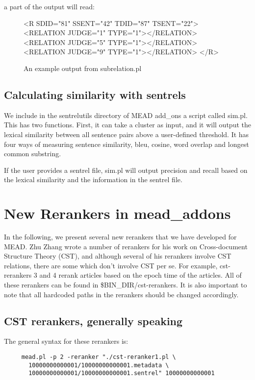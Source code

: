 \documentclass[10pt]{article}
\begin{document}
 a part of the output will read:


\begin{figure}[htp!]
\centering
\begin{boxedverbatim}
<R SDID="81" SSENT="42" TDID="87" TSENT="22">
<RELATION JUDGE="1" TYPE="1"></RELATION>
<RELATION JUDGE="5" TYPE="1"></RELATION>
<RELATION JUDGE="9" TYPE="1"></RELATION>
</R>
\end{boxedverbatim}
\caption{An example output from subrelation.pl}
\label{figure:subrelation.pl}
\end{figure}

\subsection{Calculating similarity with sentrels}
We include in the sentrelutils directory of MEAD add\_ons a script called 
sim.pl.  This has two functions.  First, it can take a cluster as input, 
and it will output the lexical similarity between all sentence pairs above 
a user-defined threshold.  It has four ways of measuring sentence 
similarity, bleu, cosine, word overlap and longest common substring.  

If the user provides a sentrel file, sim.pl will output precision and 
recall based on the lexical similarity and the information in the sentrel 
file. 


\section{New Rerankers in mead\_addons}
In the following, we present several new rerankers that we have developed 
for MEAD.  Zhu Zhang wrote a number of rerankers for his work on Cross-document 
Structure Theory (CST), and
although several of his rerankers involve CST relations, there are some 
which don't involve CST per se.  For example, cst-rerankers 3 and 4 rerank articles based 
on the epoch time of the articles.
All of these rerankers can be found in \$BIN\_DIR/cst-rerankers.
It is also important to note that all hardcoded paths in the rerankers should be changed accordingly. 


\subsection{CST rerankers, generally speaking}
The general syntax for these rerankers is:

\begin{verbatim} 
     mead.pl -p 2 -reranker "./cst-reranker1.pl \
       10000000000001/10000000000001.metadata \
       10000000000001/10000000000001.sentrel" 10000000000001
\end{verbatim}
\end{document}
